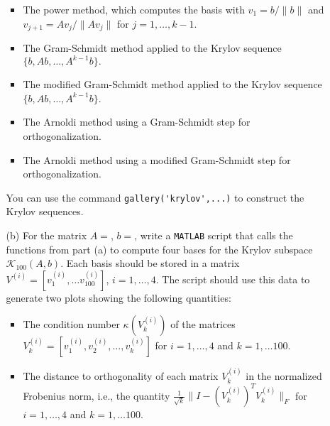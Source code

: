 \documentclass[10pt]{report}
\begin{document}
\begin{enumerate}
\begin{itemize}
\begin{itemize}
\item The power method, which computes the basis with $v_1=b/\|b\|$ and $v_{j+1}=Av_j/\|Av_j\|$ for $j=1, \ldots, k-1$. 

\item The Gram-Schmidt method applied to the Krylov sequence $\{b, Ab, \ldots, A^{k-1}b\}.$ 

\item The modified Gram-Schmidt method applied to the Krylov sequence $\{b, Ab, \ldots, A^{k-1}b\}$.
 
\item The Arnoldi method using a Gram-Schmidt step for orthogonalization.

\item The Arnoldi method using a modified Gram-Schmidt step for orthogonalization.
\end{itemize}

You can use the command \verb+gallery('krylov',...)+ to construct the Krylov sequences.


\pagebreak
\item[(b)] For the matrix $A= $, $b=$, write a \verb+MATLAB+ script that calls the functions from part (a) to compute four  bases for the Krylov subspace $\mathcal{K}_{100}(A,b)$. Each basis should be stored in a matrix \linebreak $V^{(i)}= [v_1^{(i)}, \ldots v_{100}^{(i)}]$, $i=1, \ldots, 4$. The script should use this data to generate two plots showing the following quantities:

\begin{itemize}
\item The condition number $\kappa(V_k^{(i)})$ of the matrices $V_k^{(i)}=[v_1^{(i)}, v_2^{(i)}, \ldots, v_k^{(i)}]$ for $i=1, \ldots, 4$ and $k=1, \ldots 100$.

\item The distance to orthogonality of each matrix  $V_{k}^{(i)}$  in the normalized  Frobenius norm, i.e., the
quantity $\frac{1}{\sqrt{k}}\|I-(V_k^{(i)})^TV_{k}^{(i)}\|_F$ for $i=1, \ldots, 4$ and $k=1, \ldots 100$. \end{itemize}

\end{itemize}

\end{enumerate}
\end{document}
